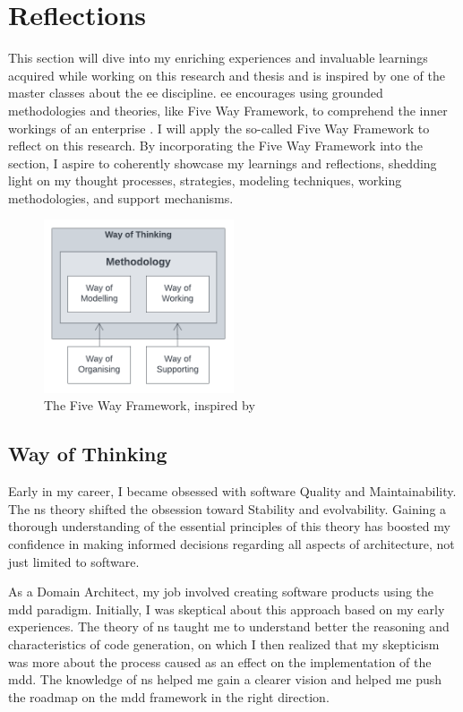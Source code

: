 \section{Reflections} \label{chap_reflection}

This section will dive into my enriching experiences and invaluable learnings acquired
while working on this research and thesis and is inspired by one of the master classes
about the \gls{ee} discipline. \gls{ee} encourages using grounded methodologies and
theories, like Five Way Framework, to comprehend the inner workings of an enterprise
\parencite[262]{dietz_enterprise_2020}. I will apply the so-called Five Way Framework to
reflect on this research. By incorporating the Five Way Framework into the section, I
aspire to coherently showcase my learnings and reflections, shedding light on my thought
processes, strategies, modeling techniques, working methodologies, and support mechanisms.

\begin{figure}[H]
    \centering
    \includegraphics[width=0.5\textwidth]{figures/5ways.pdf}
    \caption[The Five Way Framework]{The Five Way Framework, inspired by \textcite{dietz_enterprise_2020}}
    \label{fig_5ways}
\end{figure}

\subsection{Way of Thinking}

Early in my career, I became obsessed with software Quality and Maintainability. The
\gls{ns} theory shifted the obsession toward Stability and evolvability. Gaining a
thorough understanding of the essential principles of this theory has boosted my
confidence in making informed decisions regarding all aspects of architecture, not just
limited to software.

As a Domain Architect, my job involved creating software products using the \gls{mdd}
paradigm. Initially, I was skeptical about this approach based on my early experiences.
The theory of \gls{ns} taught me to understand better the reasoning and characteristics of
code generation, on which I then realized that my skepticism was more about the process
caused as an effect on the implementation of the \gls{mdd}. The knowledge of \gls{ns}
helped me gain a clearer vision and helped me push the roadmap on the \gls{mdd} framework
in the right direction.

